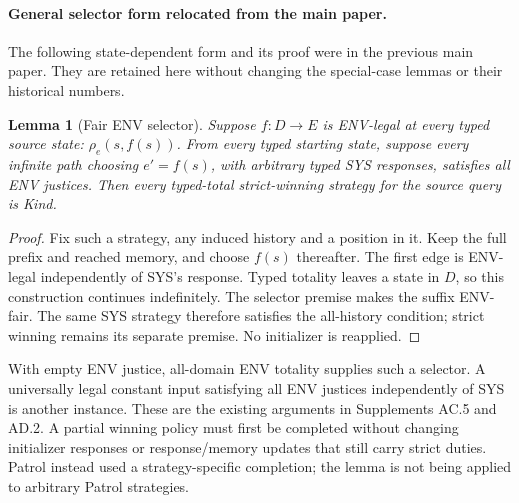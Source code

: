\paragraph{General selector form relocated from the main paper.}
The following state-dependent form and its proof were in the previous main
paper. They are retained here without changing the special-case lemmas or
their historical numbers.
\newtheorem*{rtenfairselector}{Lemma}
\begin{rtenfairselector}[Fair ENV selector]
Suppose $f:D\to E$ is ENV-legal at every typed source state:
$\rho_e(s,f(s))$. From every typed starting state, suppose every infinite
path choosing $e'=f(s)$, with arbitrary typed SYS responses, satisfies
all ENV justices. Then every typed-total strict-winning strategy for the
source query is Kind.
\end{rtenfairselector}
\begin{proof}
Fix such a strategy, any induced history and a position in it.
Keep the full prefix and reached memory, and choose $f(s)$ thereafter.
The first edge is ENV-legal independently of SYS's response. Typed totality
leaves a state in $D$, so this construction continues indefinitely.
The selector premise makes the suffix ENV-fair. The same SYS strategy
therefore satisfies the all-history condition; strict winning remains its
separate premise. No initializer is reapplied.
\end{proof}
With empty ENV justice, all-domain ENV totality supplies such a selector.
A universally legal constant input satisfying all ENV justices independently
of SYS is another instance. These are the existing arguments in Supplements
AC.5 and AD.2. A partial winning policy must first be completed without
changing initializer responses or response/memory updates that still carry
strict duties. Patrol instead used a strategy-specific completion;
the lemma is not being applied to arbitrary Patrol strategies.


